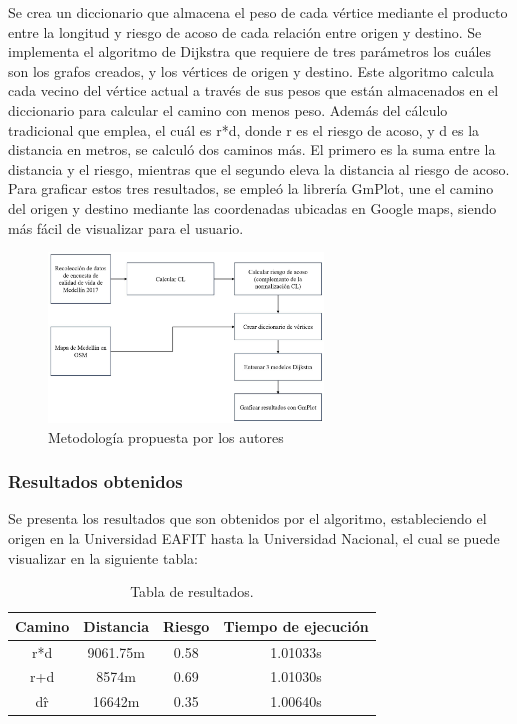 Se crea un diccionario que almacena el peso de cada vértice mediante el producto entre la longitud y riesgo de acoso de cada relación entre origen y destino. Se implementa el algoritmo de Dijkstra que requiere de tres parámetros los cuáles son los grafos creados, y los vértices de origen y destino. Este algoritmo calcula cada vecino del vértice actual a través de sus pesos que están almacenados en el diccionario para calcular el camino con menos peso. Además del cálculo tradicional que emplea, el cuál es r*d, donde r es el riesgo de acoso, y d es la distancia en metros, se calculó dos caminos más. El primero es la suma entre la distancia y el riesgo, mientras que el segundo eleva la distancia al riesgo de acoso. Para graficar estos tres resultados, se empleó la librería GmPlot, une el camino del origen y destino mediante las coordenadas ubicadas en Google maps, siendo más fácil de visualizar para el usuario.


\begin{figure}[h]
	\begin{center}
		\includegraphics[width=0.65\textwidth]{2/figures/medellinMetodo.jpg}
		\caption{Metodología propuesta por los autores}
		\label{1:fig2}
	\end{center}
\end{figure}

\subsubsection{Resultados obtenidos}
Se presenta los resultados que son obtenidos por el algoritmo, estableciendo el origen en la Universidad EAFIT hasta la Universidad Nacional, el cual se puede visualizar en la siguiente tabla:%

\begin{table}[h]
	\centering
	\begin{tabular}{c|c|c|c}
		Camino & Distancia & Riesgo & Tiempo de ejecución\\\hline
		r*d & 9061.75m & 0.58& 1.01033s\\
		r+d & 8574m& 0.69& 1.01030s\\
		d\^r& 16642m& 0.35& 1.00640s
	\end{tabular}
	\caption{\label{tab:results}Tabla de resultados.}
\end{table}

